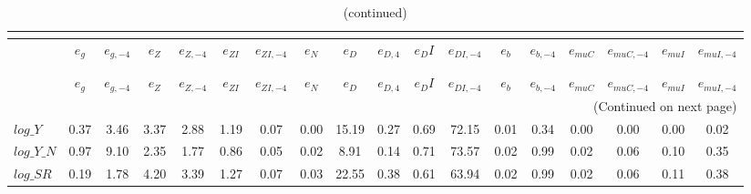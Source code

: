  
\begin{center}
\begin{longtable}{lccccccccccccccccc} 
\caption{VARIANCE DECOMPOSITION (in percent)}\\
 \label{Table:th_var_decomp_uncond}\\
\toprule 
$               $	 & 	 $           {e_g}$	 & 	 $      {e_{g,-4}}$	 & 	 $           {e_Z}$	 & 	 $      {e_{Z,-4}}$	 & 	 $        {e_{ZI}}$	 & 	 $     {e_{ZI,-4}}$	 & 	 $           {e_N}$	 & 	 $           {e_D}$	 & 	 $       {e_{D,4}}$	 & 	 $          {e_DI}$	 & 	 $     {e_{DI,-4}}$	 & 	 $           {e_b}$	 & 	 $      {e_{b,-4}}$	 & 	 $       {e_{muC}}$	 & 	 $    {e_{muC,-4}}$	 & 	 $       {e_{muI}}$	 & 	 $    {e_{muI,-4}}$\\
\midrule \endfirsthead 
\caption{(continued)}\\
 \toprule \\ 
$               $	 & 	 $           {e_g}$	 & 	 $      {e_{g,-4}}$	 & 	 $           {e_Z}$	 & 	 $      {e_{Z,-4}}$	 & 	 $        {e_{ZI}}$	 & 	 $     {e_{ZI,-4}}$	 & 	 $           {e_N}$	 & 	 $           {e_D}$	 & 	 $       {e_{D,4}}$	 & 	 $          {e_DI}$	 & 	 $     {e_{DI,-4}}$	 & 	 $           {e_b}$	 & 	 $      {e_{b,-4}}$	 & 	 $       {e_{muC}}$	 & 	 $    {e_{muC,-4}}$	 & 	 $       {e_{muI}}$	 & 	 $    {e_{muI,-4}}$\\
\midrule \endhead 
\midrule \multicolumn{18}{r}{(Continued on next page)} \\ \bottomrule \endfoot 
\bottomrule \endlastfoot 
$log\_Y         $	 & 	            0.37	 & 	            3.46	 & 	            3.37	 & 	            2.88	 & 	            1.19	 & 	            0.07	 & 	            0.00	 & 	           15.19	 & 	            0.27	 & 	            0.69	 & 	           72.15	 & 	            0.01	 & 	            0.34	 & 	            0.00	 & 	            0.00	 & 	            0.00	 & 	            0.02 \\ 
$log\_Y\_N      $	 & 	            0.97	 & 	            9.10	 & 	            2.35	 & 	            1.77	 & 	            0.86	 & 	            0.05	 & 	            0.02	 & 	            8.91	 & 	            0.14	 & 	            0.71	 & 	           73.57	 & 	            0.02	 & 	            0.99	 & 	            0.02	 & 	            0.06	 & 	            0.10	 & 	            0.35 \\ 
$log\_SR        $	 & 	            0.19	 & 	            1.78	 & 	            4.20	 & 	            3.39	 & 	            1.27	 & 	            0.07	 & 	            0.03	 & 	           22.55	 & 	            0.38	 & 	            0.61	 & 	           63.94	 & 	            0.02	 & 	            0.99	 & 	            0.02	 & 	            0.06	 & 	            0.11	 & 	            0.38 \\ 

\end{longtable}
\end{center}

